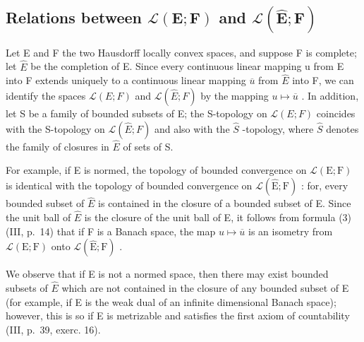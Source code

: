\subsection{\texorpdfstring{Relations between \(\mathcal{L}(\mathbf{E};\mathbf{F})\) and \(\mathcal{L}(\hat{\mathbf{E}};\mathbf{F})\)}{Relations between \textbackslash mathcal\{L\}(\textbackslash mathbf\{E\};\textbackslash mathbf\{F\}) and \textbackslash mathcal\{L\}(\textbackslash hat\{\textbackslash mathbf\{E\}\};\textbackslash mathbf\{F\})}}

Let E and F the two Hausdorff locally convex spaces, and suppose F is complete; let \(\hat{E}\) be the completion of E. Since every continuous linear mapping u from E into F extends uniquely to a continuous linear mapping \(\overline{u}\) from \(\hat{E}\) into F, we can identify the spaces \(\mathcal{L}(E;F)\) and \(\mathcal{L}(\hat{E};F)\) by the mapping \(u\mapsto\overline{u}\) . In addition, let S be a family of bounded subsets of E; the S-topology on \(\mathcal{L}(E;F)\) coincides with the S-topology on \(\mathcal{L}(\hat{E};F)\) and also with the \(\hat{S}\) -topology, where \(\hat{S}\) denotes the family of closures in \(\hat{E}\) of sets of S.

For example, if E is normed, the topology of bounded convergence on \(\mathcal{L}(\mathrm{E};\mathrm{F})\) is identical with the topology of bounded convergence on \(\mathcal{L}(\hat{\mathrm{E}};\mathrm{F})\) : for, every bounded subset of \(\hat{E}\) is contained in the closure of a bounded subset of E. Since the unit ball of \(\hat{E}\) is the closure of the unit ball of E, it follows from formula (3) (III, p.~14) that if F is a Banach space, the map \(u\mapsto\overline{u}\) is an isometry from \(\mathcal{L}(\mathrm{E};\mathrm{F})\) onto \(\mathcal{L}(\hat{\mathrm{E}};\mathrm{F})\) .

We observe that if E is not a normed space, then there may exist bounded subsets of \(\hat{E}\) which are not contained in the closure of any bounded subset of E (for example, if E is the weak dual of an infinite dimensional Banach space); however, this is so if E is metrizable and satisfies the first axiom of countability (III, p.~39, exerc. 16).

